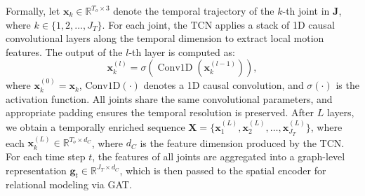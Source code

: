 \documentclass[final,5p,times,twocolumn]{elsarticle}
\begin{document}
Formally, let $\mathbf{x}_k \in \mathbb{R}^{T_o \times 3}$ denote the temporal trajectory of the $k$-th joint in $\mathbf{J}$, where $k \in \{ 1, 2, \dots, J_T \}$. For each joint, the TCN applies a stack of 1D causal convolutional layers along the temporal dimension to extract local motion features. The output of the $l$-th layer is computed as:
\begin{equation}
    \mathbf{x}_k^{(l)} = \sigma \left( \operatorname{Conv1D} \left( \mathbf{x}_k^{(l-1)} \right) \right),
\end{equation}
where $\mathbf{x}_k^{(0)} = \mathbf{x}_k$, $\text{Conv1D}(\cdot)$ denotes a 1D causal convolution, and $\sigma(\cdot)$ is the activation function. All joints share the same convolutional parameters, and appropriate padding ensures the temporal resolution is preserved. After $L$ layers, we obtain a temporally enriched sequence $\mathbf{X} = \{ \mathbf{x}_1^{(L)}, \mathbf{x}_2^{(L)}, \dots, \mathbf{x}_{J_T}^{(L)} \}$, where each $\mathbf{x}_k^{(L)} \in \mathbb{R}^{T_o \times d_C}$, where $d_C$ is the feature dimension produced by the TCN. For each time step $t$, the features of all joints are aggregated into a graph-level representation $\mathbf{g}_t \in \mathbb{R}^{J_T \times d_C}$, which is then passed to the spatial encoder for relational modeling via GAT.
\end{document}
